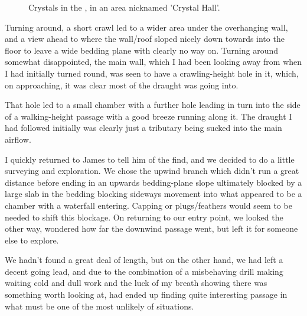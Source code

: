 \begin{figure}[t!]
\checkoddpage \ifoddpage \forcerectofloat \else \forceversofloat \fi
{}
\caption{Crystals in the \protect{}, in an area nicknamed 'Crystal Hall'. }
\end{figure}


Turning around, a short crawl led to a wider area under the overhanging
wall, and a view ahead to where the wall/roof sloped nicely down towards
into the floor to leave a wide bedding plane with clearly no way on.
Turning around somewhat disappointed, the main wall, which I had been
looking away from when I had initially turned round, was seen to have a
crawling-height hole in it, which, on approaching, it was clear most of
the draught was going into.

That hole led to a small chamber with a further hole leading in turn
into the side of a walking-height passage with a good breeze running
along it. The draught I had followed initially was clearly just a
tributary being sucked into the main airflow.

I quickly returned to James to tell him of the find, and we decided to
do a little surveying and exploration. We chose the upwind branch which
didn't run a great distance before ending in an upwards bedding-plane
slope ultimately blocked by a large slab in the bedding blocking
sideways movement into what appeared to be a chamber with a waterfall
entering. Capping or plugs/feathers would seem to be needed to shift
this blockage. On returning to our entry point, we looked the other way,
wondered how far the downwind passage went, but left it for someone else
to explore.

We hadn't found a great deal of length, but on the other hand, we had
left a decent going lead, and due to the combination of a misbehaving
drill making waiting cold and dull work and the luck of my breath
showing there was something worth looking at, had ended up finding quite
interesting passage in what must be one of the most unlikely of
situations.

